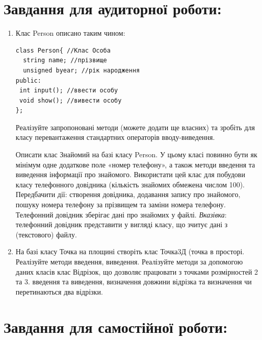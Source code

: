 \documentclass[a5paper,titlepage,openany,twoside,
]
{book_unv}%
\begin{document}
\section{Завдання для аудиторної роботи:}

\begin{enumerate}
\def\labelenumi{\arabic{enumi})}

\item
Клас Person описано таким чином:
\begin{verbatim}
class Person{ //Клас Особа
  string name; //прізвище
  unsigned byear; //рік народження
public:
 int input(); //ввести особу  
 void show(); //вивести особу
};
\end{verbatim}

Реалізуйте запропоновані методи (можете додати ще власних) та зробіть
для класу перевантаження стандартних операторів вводу-виведення.

Описати клас Знайомий на базі класу Person. У цьому класі повинно бути 
як мінімум одне додаткове поле «номер телефону»,
 а також методи введення та виведення інформації про знайомого. 
Використати цей клас для побудови класу телефонного довідника (кількість
знайомих обмежена числом 100). Передбачити дії: створення довідника, додавання запису про знайомого,
пошуку номера телефону за прізвищем та заміни номера телефону. 
Телефонний довідник зберігає дані про знайомих у файлі.
\emph{\emph{Вказівка}}: телефонний довідник представити у вигляді класу,
що зчитує дані з (текстового) файлу.

\item
  На базі класу Точка на площині створіть клас Точка3Д (точка
  в просторі. Реалізуйте методи введення, виведення.
  Реалізуйте методи за допомогою даних класів клас Відрізок,
  що дозволяє працювати з точками розмірностей 2 та 3. 
  введення та виведення, визначення довжини відрізка та
  визначення чи перетинаються два відрізки.
\end{enumerate}

\section{Завдання для самостійної роботи:}
\end{document}
